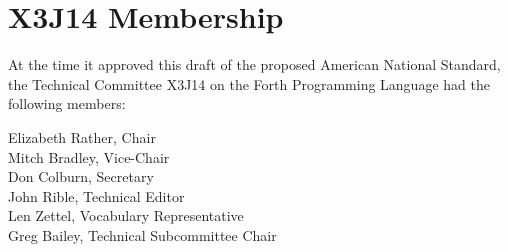 
\chapter*{X3J14 Membership}

At the time it approved this draft of the proposed American National
Standard, the Technical Committee X3J14 on the Forth Programming
Language had the following members:

\begin{flushleft}
Elizabeth Rather, Chair \\
Mitch Bradley, Vice-Chair \\
Don Colburn, Secretary \\
John Rible, Technical Editor \\
Len Zettel, Vocabulary Representative \\
Greg Bailey, Technical Subcommittee Chair \\
\end{flushleft}

